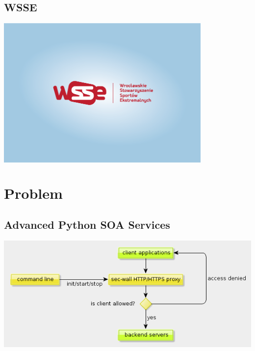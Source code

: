 \documentclass{beamer}
\begin{document}
\subsection{WSSE}

\begin{frame}
\begin{center}
 \includegraphics[height=7.5cm]{images/WSSE-Logo.png}
\end{center}
\end{frame}

\section{Problem}

\subsection{Advanced Python SOA Services}

\begin{frame}
\begin{center}
 \includegraphics[width=\textwidth]{images/sec-wall-overview.png}
\end{center}
\end{frame}
\end{document}
